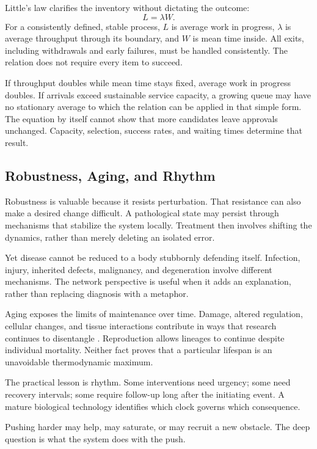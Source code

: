 \documentclass[11pt,openany]{book}
\begin{document}
Little's law clarifies the inventory without dictating the outcome:
\begin{equation}
 L=\lambda W.
\end{equation}
For a consistently defined, stable process, $L$ is average work in progress, $\lambda$ is average throughput through its boundary, and $W$ is mean time inside. All exits, including withdrawals and early failures, must be handled consistently. The relation does not require every item to succeed.

If throughput doubles while mean time stays fixed, average work in progress doubles. If arrivals exceed sustainable service capacity, a growing queue may have no stationary average to which the relation can be applied in that simple form. The equation by itself cannot show that more candidates leave approvals unchanged. Capacity, selection, success rates, and waiting times determine that result.

\subsection{Robustness, Aging, and Rhythm}

Robustness is valuable because it resists perturbation. That resistance can also make a desired change difficult. A pathological state may persist through mechanisms that stabilize the system locally. Treatment then involves shifting the dynamics, rather than merely deleting an isolated error.

Yet disease cannot be reduced to a body stubbornly defending itself. Infection, injury, inherited defects, malignancy, and degeneration involve different mechanisms. The network perspective is useful when it adds an explanation, rather than replacing diagnosis with a metaphor.

Aging exposes the limits of maintenance over time. Damage, altered regulation, cellular changes, and tissue interactions contribute in ways that research continues to disentangle \cite{lopezotin2013hallmarks}. Reproduction allows lineages to continue despite individual mortality. Neither fact proves that a particular lifespan is an unavoidable thermodynamic maximum.

The practical lesson is rhythm. Some interventions need urgency; some need recovery intervals; some require follow-up long after the initiating event. A mature biological technology identifies which clock governs which consequence.

Pushing harder may help, may saturate, or may recruit a new obstacle. The deep question is what the system does with the push.
\end{document}
